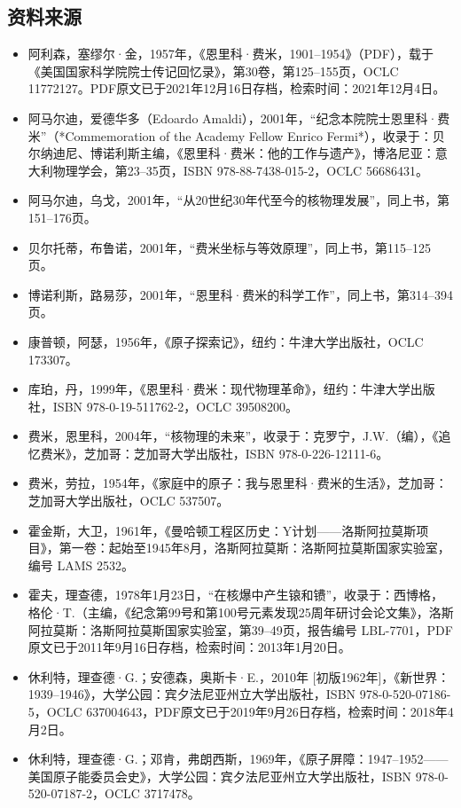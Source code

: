 \subsection{资料来源}
\begin{itemize}
\item 阿利森，塞缪尔·金，1957年，《恩里科·费米，1901–1954》（PDF），载于《美国国家科学院院士传记回忆录》，第30卷，第125–155页，OCLC 11772127。PDF原文已于2021年12月16日存档，检索时间：2021年12月4日。
\item 阿马尔迪，爱德华多（Edoardo Amaldi），2001年，“纪念本院院士恩里科·费米”（*Commemoration of the Academy Fellow Enrico Fermi*），收录于：贝尔纳迪尼、博诺利斯主编，《恩里科·费米：他的工作与遗产》，博洛尼亚：意大利物理学会，第23–35页，ISBN 978-88-7438-015-2，OCLC 56686431。
\item 阿马尔迪，乌戈，2001年，“从20世纪30年代至今的核物理发展”，同上书，第151–176页。
\item 贝尔托蒂，布鲁诺，2001年，“费米坐标与等效原理”，同上书，第115–125页。
\item 博诺利斯，路易莎，2001年，“恩里科·费米的科学工作”，同上书，第314–394页。
\item 康普顿，阿瑟，1956年，《原子探索记》，纽约：牛津大学出版社，OCLC 173307。
\item 库珀，丹，1999年，《恩里科·费米：现代物理革命》，纽约：牛津大学出版社，ISBN 978-0-19-511762-2，OCLC 39508200。
\item 费米，恩里科，2004年，“核物理的未来”，收录于：克罗宁，J.W.（编），《追忆费米》，芝加哥：芝加哥大学出版社，ISBN 978-0-226-12111-6。
\item 费米，劳拉，1954年，《家庭中的原子：我与恩里科·费米的生活》，芝加哥：芝加哥大学出版社，OCLC 537507。
\item 霍金斯，大卫，1961年，《曼哈顿工程区历史：Y计划——洛斯阿拉莫斯项目》，第一卷：起始至1945年8月，洛斯阿拉莫斯：洛斯阿拉莫斯国家实验室，编号 LAMS 2532。
\item 霍夫，理查德，1978年1月23日，“在核爆中产生锿和镄”，收录于：西博格，格伦·T.（主编，《纪念第99号和第100号元素发现25周年研讨会论文集》，洛斯阿拉莫斯：洛斯阿拉莫斯国家实验室，第39–49页，报告编号 LBL-7701，PDF原文已于2011年9月16日存档，检索时间：2013年1月20日。
\item 休利特，理查德·G.；安德森，奥斯卡·E.，2010年 [初版1962年]，《新世界：1939–1946》，大学公园：宾夕法尼亚州立大学出版社，ISBN 978-0-520-07186-5，OCLC 637004643，PDF原文已于2019年9月26日存档，检索时间：2018年4月2日。
\item 休利特，理查德·G.；邓肯，弗朗西斯，1969年，《原子屏障：1947–1952——美国原子能委员会史》，大学公园：宾夕法尼亚州立大学出版社，ISBN 978-0-520-07187-2，OCLC 3717478。

\end{itemize}
